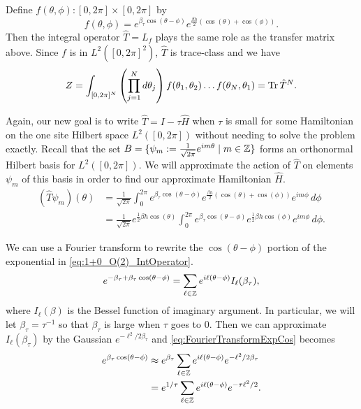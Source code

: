 \documentclass[11pt,reqno]{amsart}
\begin{document}
	Define $f(\theta,\phi): [0,2\pi]\times [0,2\pi]$ by 
	\[f(\theta,\phi)=e^{\beta_\tau \cos(\theta -\phi)}e^{\frac{\beta h}{2}(\cos(\theta)+\cos(\phi))}. \]
	Then the integral operator $\hat{T}=L_f$ plays the same role as the transfer matrix above.
	Since $f$ is in $L^2([0,2\pi]^2)$, $\hat{T}$ is trace-class and we have
	\[Z= \int_{[0,2\pi]^N} \left(\prod_{j=1}^N d\theta_j \right) f(\theta_1,\theta_2)\ldots f(\theta_N,\theta_1) = \Tr \hat{T}^N. \]
	
	Again, our new goal is to write $\hat{T}=I-\tau\hat{H}$ when $\tau$ is small for some Hamiltonian on the one site Hilbert space $L^2([0,2\pi])$ without needing to solve the problem exactly. 
	Recall that the set $B=\{\psi_m:=\frac{1}{\sqrt{2\pi}} e^{im\theta} \mid m \in \mathbb{Z} \}$ forms an orthonormal Hilbert basis for $L^2([0,2\pi])$.
	We will approximate the action of $\hat{T}$ on elements $\psi_m$ of this basis in order to find our approximate Hamiltonian $\hat{H}$.
	\begin{align}
		(\hat{T}\psi_m)(\theta) &= \frac{1}{\sqrt{2\pi}}\int_{0}^{2\pi} e^{\beta_\tau \cos(\theta -\phi)}e^{\frac{\beta h}{2}(\cos(\theta)+\cos(\phi))} e^{im\phi}\, d\phi \nonumber \\
		&=\frac{1}{\sqrt{2\pi}}e^{\frac{1}{2}\beta h \cos(\theta)} \int_{0}^{2\pi} e^{\beta_\tau \cos(\theta -\phi)}e^{\frac{1}{2}\beta h \cos(\phi)}e^{im\phi}\, d\phi. \label{eq:1+0_O(2)_IntOperator}
	\end{align}
	
	We can use a Fourier transform to rewrite the $\cos(\theta-\phi)$ portion of the exponential in \cref{eq:1+0_O(2)_IntOperator}.
	\begin{equation}\label{eq:FourierTransformExpCos}
		e^{-\beta_\tau+\beta_\tau\cos(\theta-\phi)}=\sum_{\ell\in \mathbb{Z}}e^{i\ell(\theta-\phi)}I_\ell(\beta_\tau),
	\end{equation}
	where $I_\ell(\beta)$ is the Bessel function of imaginary argument.
	In particular, we will let $\beta_\tau=\tau^{-1}$ so that $\beta_\tau$ is large when $\tau$ goes to 0. 
	Then we can approximate $I_\ell(\beta_\tau)$ by the Gaussian $e^{-\ell^2/2\beta_\tau}$ and \cref{eq:FourierTransformExpCos} becomes
	\begin{align}
		e^{\beta_\tau\cos(\theta-\phi)}&\approx e^{\beta_\tau}\sum_{\ell\in \mathbb{Z}}e^{i\ell(\theta-\phi)}e^{-\ell^2/2\beta_\tau}\\
			&=e^{1/\tau}\sum_{\ell\in \mathbb{Z}}e^{i\ell(\theta-\phi)}e^{-\tau\ell^2/2}. \label{eq:FourierTransformExpCosApprox}
	\end{align}
	
\end{document}
